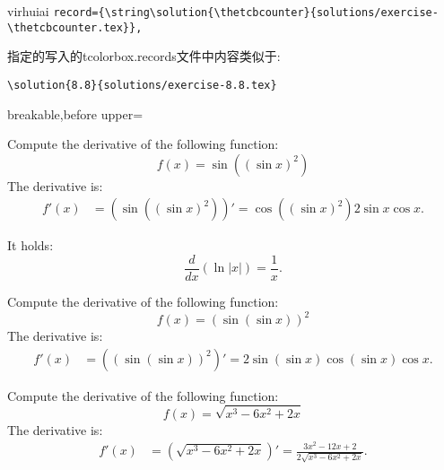 
\begin{引述之言}{virhuiai}
\small\verb|record={\string\solution{\thetcbcounter}{solutions/exercise-\thetcbcounter.tex}},|

指定的写入的tcolorbox.records文件中内容类似于:

\verb|\solution{8.8}{solutions/exercise-8.8.tex}|
\end{引述之言}

\begin{dispListing*}{breakable,before upper=}
\tcbstartrecording\relax

\begin{exercise}
  Compute the derivative of the following function:
  \begin{equation*}
    f(x)=\sin((\sin x)^2)
  \end{equation*}
\tcblower
  The derivative is:
  \begin{align*}
    f'(x) &= \left( \sin((\sin x)^2) \right)'
    =\cos((\sin x)^2) 2\sin x \cos x.
  \end{align*}
\end{exercise}

\begin{exercise}[no solution]
  It holds:
  \begin{equation*}
    \frac{d}{dx}\left(\ln|x|\right) = \frac{1}{x}.
  \end{equation*}
\end{exercise}

\begin{exercise}
  Compute the derivative of the following function:
  \begin{equation*}
    f(x)=(\sin(\sin x))^2
  \end{equation*}
\tcblower
  The derivative is:
  \begin{align*}
    f'(x) &= \left( (\sin(\sin x))^2 \right)'
    =2\sin(\sin x)\cos(\sin x)\cos x.
  \end{align*}
\end{exercise}

\begin{exercise}
  Compute the derivative of the following function:
  \begin{equation*}
    f(x)=\sqrt{x^3-6x^2+2x}
  \end{equation*}
\tcblower
  The derivative is:
  \begin{align*}
    f'(x) &= \left( \sqrt{x^3-6x^2+2x} \right)'
    = \frac{3x^2-12x+2}{2\sqrt{x^3-6x^2+2x}}.
  \end{align*}
\end{exercise}


\end{dispListing*}
